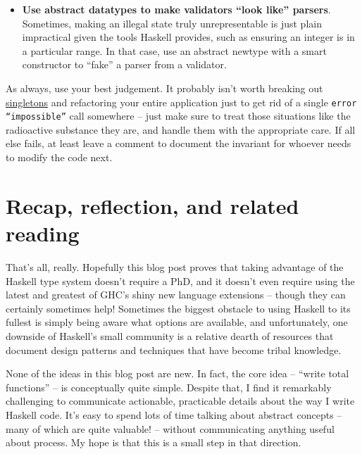 \begin{itemize}
\item \textbf{Use abstract datatypes to make validators ``look like'' parsers}. Sometimes, making an illegal state truly unrepresentable is just plain impractical given the tools Haskell provides, such as ensuring an integer is in a particular range. In that case, use an abstract newtype with a smart constructor to ``fake'' a parser from a validator.                                                                                                                                                                                                                                                                                                                                             \end{itemize}
As always, use your best judgement. It probably isn't worth breaking out \href{https://hackage.haskell.org/package/singletons}{singletons} and refactoring your entire application just to get rid of a single \texttt{error ``impossible''} call somewhere -- just make sure to treat those situations like the radioactive substance they are, and handle them with the appropriate care. If all else fails, at least leave a comment to document the invariant for whoever needs to modify the code next.



\section{Recap, reflection, and related reading}


That's all, really. Hopefully this blog post proves that taking advantage of the Haskell type system doesn't require a PhD, and it doesn't even require using the latest and greatest of GHC's shiny new language extensions -- though they can certainly sometimes help! Sometimes the biggest obstacle to using Haskell to its fullest is simply being aware what options are available, and unfortunately, one downside of Haskell's small community is a relative dearth of resources that document design patterns and techniques that have become tribal knowledge.

None of the ideas in this blog post are new. In fact, the core idea -- ``write total functions'' -- is conceptually quite simple. Despite that, I find it remarkably challenging to communicate actionable, practicable details about the way I write Haskell code. It's easy to spend lots of time talking about abstract concepts -- many of which are quite valuable! -- without communicating anything useful about process. My hope is that this is a small step in that direction.

